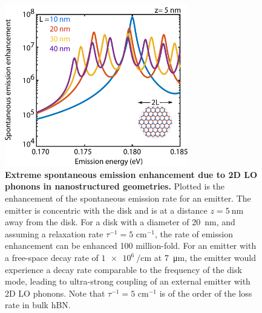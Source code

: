 \documentclass[aps,prb,twocolumn,
	           groupedaddress,superscriptaddress,
               amsfonts,amssymb,amsmath,floatfix,
	           citeautoscript]{revtex4-1}
\newcommand{\comment}[2]{%
    \ifbool{togglecomments}%
    {\textcolor{blue!70!black}{\small\textsf{%
    \textsuperscript{\textsc{\textsf{\MakeLowercase{#1}}}}%
    [#2]}}} %
    {}}     %
\begin{document}




\begin{figure}[t]
    \includegraphics[width=80mm]{fig3.pdf}
    \caption{%
        \textbf{Extreme spontaneous emission enhancement due to 2D LO phonons in nanostructured geometries.} Plotted is the enhancement of the spontaneous emission rate for an emitter. The emitter is concentric with the disk and is at a distance $z=\SI{5}{\nm}$ away from the disk. For a disk with a diameter of \SI{20}{\nm}, and assuming a relaxation rate $\tau^{-1} = 5$ cm$^{-1}$, the rate of emission enhancement can be enhanced \num{100} million-fold. For an emitter with a free-space decay rate of $\SI{1e6}{\per\cm}$ at \SI{7}{\micro\m}, the emitter would experience a decay rate comparable to the frequency of the disk mode, leading to ultra-strong coupling of an external emitter with 2D LO phonons. Note that $\tau^{-1} = 5$ cm$^{-1}$ is of the order of the loss rate in bulk hBN.
        \label{fig:3}
        }
\end{figure}
\end{document}
